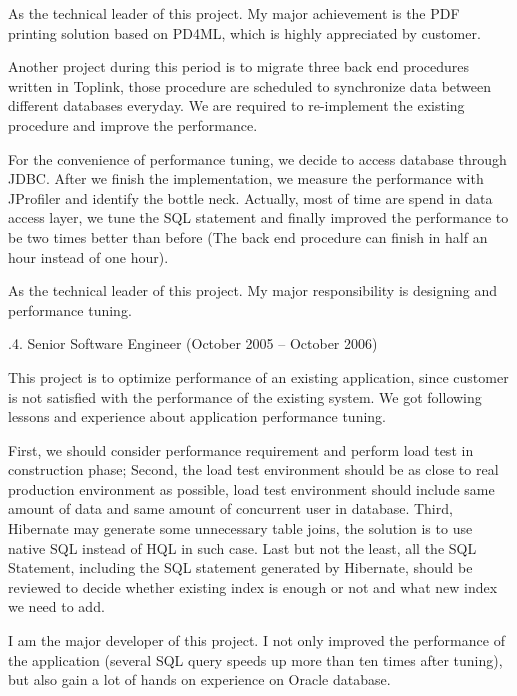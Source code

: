 As the technical leader of this project. My major achievement is
the PDF printing solution based on PD4ML, which is highly appreciated by customer.

\smallskip

Another project during this period is to migrate three back end procedures
written in Toplink, those procedure are scheduled to synchronize data between 
different databases everyday. We are required to re-implement
the existing procedure and improve the performance. 

For the convenience of performance tuning, we decide to access database through JDBC.
After we finish the implementation, we measure the performance with JProfiler and identify the
bottle neck. Actually, most of time are spend in data access layer, we tune
the SQL statement and finally improved the performance to be two times better than before
(The back end procedure can finish in half an hour instead of one hour).

As the technical leader of this project. My major responsibility is
designing and performance tuning.

.4. Senior Software Engineer (October 2005 -- October 2006)\par
\noindent
This project is to optimize performance of an existing application, 
since customer is not satisfied with the performance of the existing system. 
We got following lessons and experience about application performance tuning. 

First, we should consider performance requirement and perform load test in construction phase; 
Second, the load test environment should be as close to real production environment as possible,
load test environment should include same amount of data and same amount of concurrent user in database. 
Third, Hibernate may generate some unnecessary table joins, the solution
is to use native SQL instead of HQL in such case. 
Last but not the least, all the SQL Statement, including the SQL statement 
generated by Hibernate, should be reviewed to decide whether existing index 
is enough or not and what new index we need to add. 

I am the major developer of this project. I not only improved the performance
of the application (several SQL query speeds up more than ten times after tuning),
but also gain a lot of hands on experience on Oracle database.


